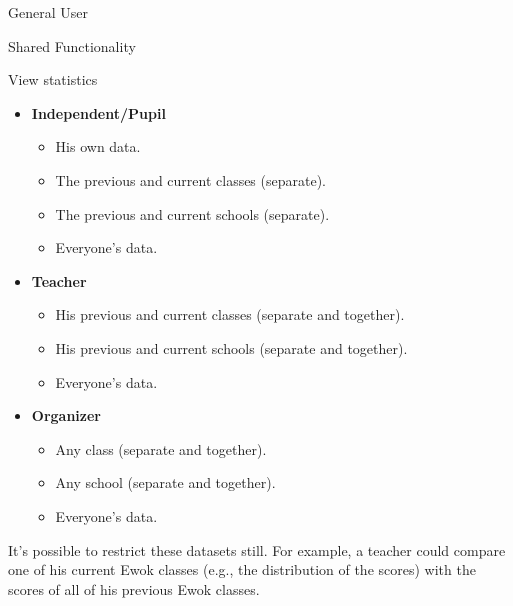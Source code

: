 \begin{section}{General User}
\begin{subsection}{Shared Functionality}
\begin{subsubsection}{View statistics}
            \begin{itemize}
                \item \textbf{Independent/Pupil}
                    \begin{itemize}
                        \item His own data.
                        \item The previous and current classes (separate).
                        \item The previous and current schools (separate).
                        \item Everyone's data.
                    \end{itemize}
                \item \textbf{Teacher}
                    \begin{itemize}
                        \item His previous and current classes (separate and
                            together).
                        \item His previous and current schools (separate and
                            together).
                        \item Everyone's data.
                    \end{itemize}
                \item \textbf{Organizer}
                    \begin{itemize}
                        \item Any class (separate and together).
                        \item Any school (separate and together).
                        \item Everyone's data.
                    \end{itemize}
            \end{itemize}

            It's possible to restrict these datasets still. For example, a
            teacher could compare one of his current Ewok classes (e.g., the
            distribution of the scores) with the scores of all of his previous
            Ewok classes.
        \end{subsubsection}

    \end{subsection}

\end{section}


